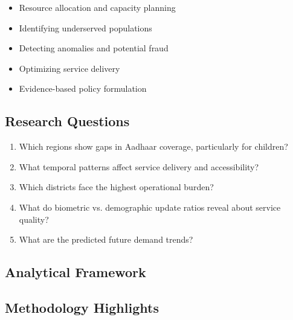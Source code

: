 \documentclass[12pt,a4paper]{article}
\begin{document}
\begin{itemize}
    \item Resource allocation and capacity planning
    \item Identifying underserved populations
    \item Detecting anomalies and potential fraud
    \item Optimizing service delivery
    \item Evidence-based policy formulation
\end{itemize}

\subsection{Research Questions}

\begin{enumerate}
    \item Which regions show gaps in Aadhaar coverage, particularly for children?
    \item What temporal patterns affect service delivery and accessibility?
    \item Which districts face the highest operational burden?
    \item What do biometric vs. demographic update ratios reveal about service quality?
    \item What are the predicted future demand trends?
\end{enumerate}

\subsection{Analytical Framework}

\begin{center}
\end{center}

\subsection{Methodology Highlights}
\end{document}
